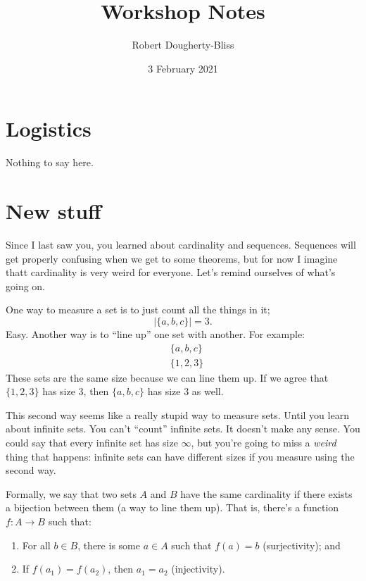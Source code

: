 \documentclass[12pt]{article}
\title{Workshop Notes}
\author{Robert Dougherty-Bliss}
\date{3 February 2021}
\theoremstyle{definition}
\begin{document}
\maketitle

\section*{Logistics}%
\label{sec:logistics}

Nothing to say here.

\section*{New stuff}%
\label{sec:new_stuff}

Since I last saw you, you learned about cardinality and sequences. Sequences
will get properly confusing when we get to some theorems, but for now I imagine
thatt cardinality is very weird for everyone. Let's remind ourselves of what's
going on.

One way to measure a set is to just count all the things in it;
\begin{equation*}
    |\{a, b, c\}| = 3.
\end{equation*}
Easy. Another way is to ``line up'' one set with another. For example:
\begin{align*}
    &\{a, b, c\} \\
    &\{1, 2, 3\}
\end{align*}
These sets are the same size because we can line them up. If we agree that
$\{1, 2, 3\}$ has size $3$, then $\{a, b, c\}$ has size $3$ as well.

This second way seems like a really stupid way to measure sets. Until you learn
about infinite sets. You can't ``count'' infinite sets. It doesn't make any
sense. You could say that every infinite set has size $\infty$, but you're
going to miss a \emph{weird} thing that happens: infinite sets can have
different sizes if you measure using the second way.

Formally, we say that two sets $A$ and $B$ have the same cardinality if there
exists a bijection between them (a way to line them up). That is, there's a
function $f \colon A \to B$ such that:
\begin{enumerate}
    \item For all $b \in B$, there is some $a \in A$ such that $f(a) = b$ (surjectivity); and
    \item If $f(a_1) = f(a_2)$, then $a_1 = a_2$ (injectivity).
\end{enumerate}
\end{document}
